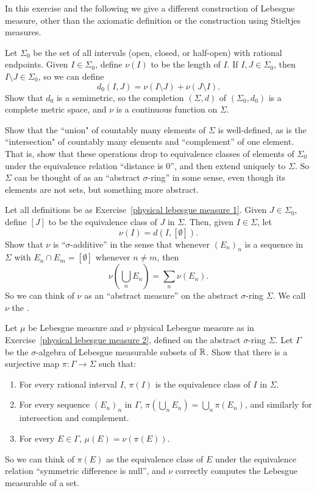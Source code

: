 \begin{exercise}
\label{physical lebesgue measure 1}
In this exercise and the following we give a different construction of Lebesgue measure, other than the axiomatic definition or the construction using Stieltjes measures.

Let $\Sigma_0$ be the set of all intervals (open, closed, or half-open) with rational endpoints.
Given $I \in \Sigma_0$, define $\nu(I)$ to be the length of $I$.
If $I, J \in \Sigma_0$, then $I \setminus J \in \Sigma_0$, so we can define
\[d_0(I, J) = \nu(I \setminus J) + \nu(J \setminus I).\]
Show that $d_0$ is a semimetric, so the completion $(\Sigma, d)$ of $(\Sigma_0, d_0)$ is a complete metric space, and $\nu$ is a continuous function on $\Sigma$.

Show that the ``union" of countably many elements of $\Sigma$ is well-defined, as is the ``intersection" of countably many elements and ``complement'' of one element.
That is, show that these operations drop to equivalence classes of elements of $\Sigma_0$ under the equivalence relation ``distance is $0$'', and then extend uniquely to $\Sigma$.
So $\Sigma$ can be thought of as an ``abstract $\sigma$-ring'' in some sense, even though its elements are not sets, but something more abstract.
\end{exercise}

\begin{exercise}
\label{physical lebesgue measure 2}
Let all definitions be as Exercise~\ref{physical lebesgue measure 1}.
Given $J \in \Sigma_0$, define $[J]$ to be the equivalence class of $J$ in $\Sigma$.
Then, given $I \in \Sigma$, let
\[\nu(I) = d(I, [\emptyset]).\]
Show that $\nu$ is ``$\sigma$-additive'' in the sense that whenever $(E_{n})_{n}$ is a sequence in $\Sigma$ with $E_{n} \cap E_{m} = [\emptyset]$ whenever $n \neq m$, then
\[\nu\left(\bigcup_{n} E_{n}\right) = \sum_{n} \nu(E_{n}).\]
So we can think of $\nu$ as an ``abstract measure'' on the abstract $\sigma$-ring $\Sigma$.
We call $\nu$ the .
\end{exercise}

\begin{exercise}
\label{physical lebesgue measure 3}
Let $\mu$ be Lebesgue measure and $\nu$ physical Lebesgue measure as in Exercise~\ref{physical lebesgue measure 2}, defined on the abstract $\sigma$-ring $\Sigma$.
Let $\Gamma$ be the $\sigma$-algebra of Lebesgue measurable subsets of $\mathbb{R}$. Show that there is a surjective map $\pi: \Gamma \to \Sigma$ such that:
\begin{enumerate}
\item For every rational interval $I$, $\pi(I)$ is the equivalence class of $I$ in $\Sigma$.
\item For every sequence $(E_{n})_{n}$ in $\Gamma$, $\pi(\bigcup_{n} E_{n}) = \bigcup_{n} \pi(E_{n})$, and similarly for intersection and complement.
\item For every $E \in \Gamma$, $\mu(E) = \nu(\pi(E))$.
\end{enumerate}
So we can think of $\pi(E)$ as the equivalence class of $E$ under the equivalence relation ``symmetric difference is null'', and $\nu$ correctly computes the Lebesgue measurable of a set.
\end{exercise}
